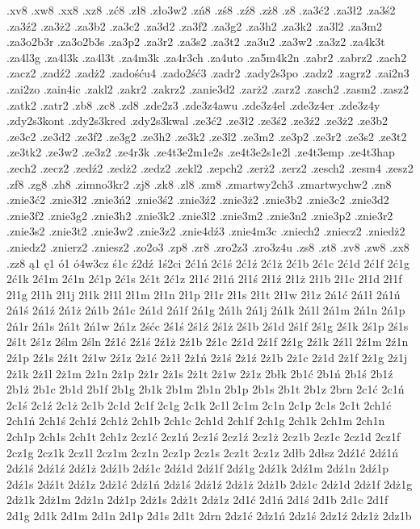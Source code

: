 {.xv8
.xw8
.xx8
.xz8
.zć8
.zł8
.zło3w2
.zń8
.zś8
.zź8
.zż8
.z8
.za3ć2
.za3ł2
.za3ś2
.za3ź2
.za3ż2
.za3b2
.za3c2
.za3d2
.za3f2
.za3g2
.za3h2
.za3k2
.za3l2
.za3m2
.za3o2b3r
.za3o2b3s
.za3p2
.za3r2
.za3s2
.za3t2
.za3u2
.za3w2
.za3z2
.za4k3t
.za4l3g
.za4l3k
.za4l3t
.za4m3k
.za4r3ch
.za4uto
.za5m4k2n
.zabr2
.zabrz2
.zach2
.zacz2
.zadź2
.zadż2
.zadośću4
.zado2ść3
.zadr2
.zady2s3po
.zadz2
.zagrz2
.zai2n3
.zai2zo
.zain4ic
.zakl2
.zakr2
.zakrz2
.zanie3d2
.zarż2
.zarz2
.zasch2
.zasm2
.zasz2
.zatk2
.zatr2
.zb8
.zc8
.zd8
.zde2z3
.zde3z4awu
.zde3z4el
.zde3z4er
.zde3z4y
.zdy2s3kont
.zdy2s3kred
.zdy2s3kwal
.ze3ć2
.ze3ł2
.ze3ś2
.ze3ź2
.ze3ż2
.ze3b2
.ze3c2
.ze3d2
.ze3f2
.ze3g2
.ze3h2
.ze3k2
.ze3l2
.ze3m2
.ze3p2
.ze3r2
.ze3s2
.ze3t2
.ze3tk2
.ze3w2
.ze3z2
.ze4r3k
.ze4t3e2m1e2s
.ze4t3e2s1e2l
.ze4t3emp
.ze4t3hap
.zech2
.zecz2
.zedź2
.zedż2
.zedz2
.zekl2
.zepch2
.zerż2
.zerz2
.zesch2
.zesm4
.zesz2
.zf8
.zg8
.zh8
.zimno3kr2
.zj8
.zk8
.zl8
.zm8
.zmartwy2ch3
.zmartwychw2
.zn8
.znie3ć2
.znie3ł2
.znie3ń2
.znie3ś2
.znie3ź2
.znie3ż2
.znie3b2
.znie3c2
.znie3d2
.znie3f2
.znie3g2
.znie3h2
.znie3k2
.znie3l2
.znie3m2
.znie3n2
.znie3p2
.znie3r2
.znie3s2
.znie3t2
.znie3w2
.znie3z2
.znie4dź3
.znie4m3c
.zniech2
.zniecz2
.zniedż2
.zniedz2
.znierz2
.zniesz2
.zo2o3
.zp8
.zr8
.zro2z3
.zro3z4u
.zs8
.zt8
.zv8
.zw8
.zx8
.zz8
ą1
ę1
ó1
ó4w3cz
ś1c
ź2dź
1ś2ci
2ć1ń
2ć1ś
2ć1ź
2ć1ż
2ć1b
2ć1c
2ć1d
2ć1f
2ć1g
2ć1k
2ć1m
2ć1n
2ć1p
2ć1s
2ć1t
2ć1z
2ł1ć
2ł1ń
2ł1ś
2ł1ź
2ł1ż
2ł1b
2ł1c
2ł1d
2ł1f
2ł1g
2ł1h
2ł1j
2ł1k
2ł1l
2ł1m
2ł1n
2ł1p
2ł1r
2ł1s
2ł1t
2ł1w
2ł1z
2ń1ć
2ń1ł
2ń1ń
2ń1ś
2ń1ź
2ń1ż
2ń1b
2ń1c
2ń1d
2ń1f
2ń1g
2ń1h
2ń1j
2ń1k
2ń1l
2ń1m
2ń1n
2ń1p
2ń1r
2ń1s
2ń1t
2ń1w
2ń1z
2śćc
2ś1ś
2ś1ź
2ś1ż
2ś1b
2ś1d
2ś1f
2ś1g
2ś1k
2ś1p
2ś1s
2ś1t
2ś1z
2ślm
2śln
2ź1ć
2ź1ś
2ź1ż
2ź1b
2ź1c
2ź1d
2ź1f
2ź1g
2ź1k
2ź1l
2ź1m
2ź1n
2ź1p
2ź1s
2ź1t
2ź1w
2ź1z
2ż1ć
2ż1ł
2ż1ń
2ż1ś
2ż1ź
2ż1b
2ż1c
2ż1d
2ż1f
2ż1g
2ż1j
2ż1k
2ż1l
2ż1m
2ż1n
2ż1p
2ż1r
2ż1s
2ż1t
2ż1w
2ż1z
2błk
2b1ć
2b1ń
2b1ś
2b1ź
2b1ż
2b1c
2b1d
2b1f
2b1g
2b1k
2b1m
2b1n
2b1p
2b1s
2b1t
2b1z
2brn
2c1ć
2c1ń
2c1ś
2c1ź
2c1ż
2c1b
2c1d
2c1f
2c1g
2c1k
2c1l
2c1m
2c1n
2c1p
2c1s
2c1t
2ch1ć
2ch1ń
2ch1ś
2ch1ź
2ch1ż
2ch1b
2ch1c
2ch1d
2ch1f
2ch1g
2ch1k
2ch1m
2ch1n
2ch1p
2ch1s
2ch1t
2ch1z
2cz1ć
2cz1ń
2cz1ś
2cz1ź
2cz1ż
2cz1b
2cz1c
2cz1d
2cz1f
2cz1g
2cz1k
2cz1l
2cz1m
2cz1n
2cz1p
2cz1s
2cz1t
2cz1z
2dłb
2dłsz
2dź1ć
2dź1ń
2dź1ś
2dź1ź
2dź1ż
2dź1b
2dź1c
2dź1d
2dź1f
2dź1g
2dź1k
2dź1m
2dź1n
2dź1p
2dź1s
2dź1t
2dź1z
2dż1ć
2dż1ń
2dż1ś
2dż1ź
2dż1ż
2dż1b
2dż1c
2dż1d
2dż1f
2dż1g
2dż1k
2dż1m
2dż1n
2dż1p
2dż1s
2dż1t
2dż1z
2d1ć
2d1ń
2d1ś
2d1b
2d1c
2d1f
2d1g
2d1k
2d1m
2d1n
2d1p
2d1s
2d1t
2drn
2dz1ć
2dz1ń
2dz1ś
2dz1ź
2dz1ż
2dz1b
}
